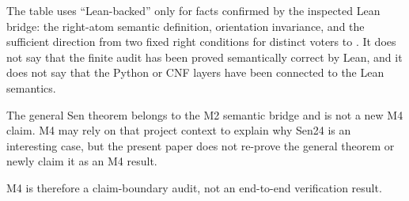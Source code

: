 The table uses ``Lean-backed'' only for facts confirmed by the inspected Lean
bridge: the right-atom semantic definition, orientation invariance, and the
sufficient direction from two fixed right conditions for distinct voters to
. It does not say that the finite audit has been proved
semantically correct by Lean, and it does not say that the Python or CNF layers
have been connected to the Lean semantics.

The general Sen theorem belongs to the M2 semantic bridge and is not a new M4
claim. M4 may rely on that project context to explain why Sen24 is an
interesting case, but the present paper does not re-prove the general theorem
or newly claim it as an M4 result.

M4 is therefore a claim-boundary audit, not an end-to-end verification result.
